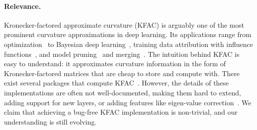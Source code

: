 \paragraph{Relevance.} Kronecker-factored approximate curvature (KFAC) is arguably one of the most prominent curvature approximations in deep learning.
Its applications range from optimization~\cite{martens2015optimizing,grosse2016kroneckerfactored,eschenhagen2023kroneckerfactored,benzing2022gradient,petersen2023isaac} to Bayesian deep learning~\cite{daxberger2021laplace}, training data attribution with influence functions~\cite{grosse2023studying,bae2024training}, and model pruning~\cite{wang2019eigendamage} and merging~\cite{tam2024merging}.
The intuition behind KFAC is easy to understand: it approximates curvature information in the form of Kronecker-factored matrices that are cheap to store and compute with.
There exist several packages that compute KFAC~\cite{botev2022kfac-jax,dangel2020backpack,osawa2023asdl}.
However, the details of these implementations are often not well-documented, making them hard to extend, \eg\,adding support for new layers, or adding features like eigen-value correction~\cite{george2018fast}.
We claim that achieving a bug-free KFAC implementation is non-trivial, and our understanding is still evolving.


